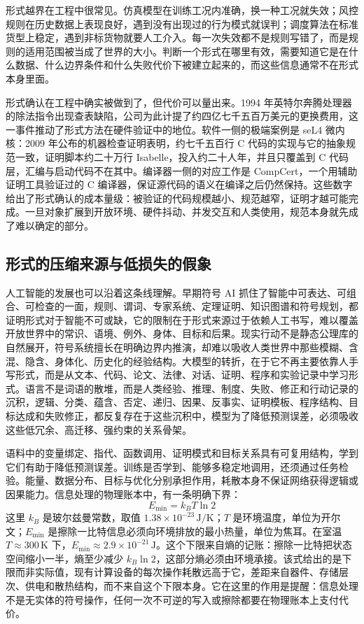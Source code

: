 形式越界在工程中很常见。仿真模型在训练工况内准确，换一种工况就失效；风控规则在历史数据上表现良好，遇到没有出现过的行为模式就误判；调度算法在标准货型上稳定，遇到非标货物就要人工介入。每一次失效都不是规则写错了，而是规则的适用范围被当成了世界的大小。判断一个形式在哪里有效，需要知道它是在什么数据、什么边界条件和什么失败代价下被建立起来的，而这些信息通常不在形式本身里面。

形式确认在工程中确实被做到了，但代价可以量出来。1994 年英特尔奔腾处理器的除法指令出现查表缺陷，公司为此计提了约四亿七千五百万美元的更换费用，这一事件推动了形式方法在硬件验证中的地位。软件一侧的极端案例是 seL4 微内核：2009 年公布的机器检查证明表明，约七千五百行 C 代码的实现与它的抽象规范一致，证明脚本约二十万行 Isabelle，投入约二十人年，并且只覆盖到 C 代码层，汇编与启动代码不在其中\cite{klein2009sel4}。编译器一侧的对应工作是 CompCert，一个用辅助证明工具验证过的 C 编译器，保证源代码的语义在编译之后仍然保持\cite{leroy2009compcert}。这些数字给出了形式确认的成本量级：被验证的代码规模越小、规范越窄，证明才越可能完成。一旦对象扩展到开放环境、硬件抖动、并发交互和人类使用，规范本身就先成了难以确定的部分。

\subsection{形式的压缩来源与低损失的假象}


人工智能的发展也可以沿着这条线理解。早期符号 AI 抓住了智能中可表达、可组合、可检查的一面，规则、谓词、专家系统、定理证明、知识图谱和符号规划，都证明形式对于智能不可或缺，它的限制在于形式来源过于依赖人工书写，难以覆盖开放世界中的常识、语境、例外、身体、目标和后果。现实行动不是静态公理库的自然展开，符号系统擅长在明确边界内推演，却难以吸收人类世界中那些模糊、含混、隐含、身体化、历史化的经验结构。大模型的转折，在于它不再主要依靠人手写形式，而是从文本、代码、论文、法律、对话、证明、程序和实验记录中学习形式。语言不是词语的散堆，而是人类经验、推理、制度、失败、修正和行动记录的沉积，逻辑、分类、蕴含、否定、递归、因果、反事实、证明模板、程序结构、目标达成和失败修正，都反复存在于这些沉积中，模型为了降低预测误差，必须吸收这些低冗余、高迁移、强约束的关系骨架。

语料中的变量绑定、指代、函数调用、证明模式和目标关系具有可复用结构，学到它们有助于降低预测误差。训练是否学到、能够多稳定地调用，还须通过任务检验。能量、数据分布、目标与优化分别承担作用，耗散本身不保证网络获得逻辑或因果能力。信息处理的物理账本中，有一条明确下界：
\begin{equation}
E_{\min}=k_B T\ln 2
\end{equation}
这里 $k_B$ 是玻尔兹曼常数，取值 $1.38\times10^{-23}\,\mathrm{J/K}$；$T$ 是环境温度，单位为开尔文；$E_{\min}$ 是擦除一比特信息必须向环境排放的最小热量，单位为焦耳。在室温 $T\approx300\,\mathrm{K}$ 下，$E_{\min}\approx2.9\times10^{-21}\,\mathrm{J}$。这个下限来自熵的记账：擦除一比特把状态空间缩小一半，熵至少减少 $k_B\ln 2$，这部分熵必须由环境承接。该式给出的是下限而非实际值，现有计算设备的每次操作耗散远高于它，差距来自器件、存储层次、供电和散热结构，而不来自这个下限本身。它在这里的作用是提醒：信息处理不是无实体的符号操作，任何一次不可逆的写入或擦除都要在物理账本上支付代价。

